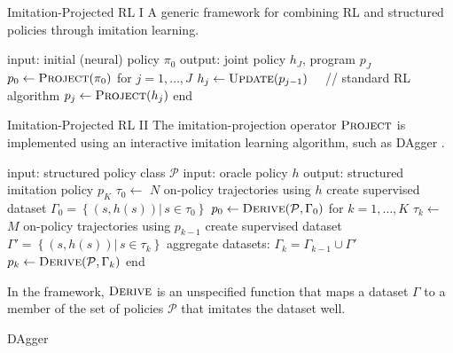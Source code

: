 \begin{frame}[fragile]{Imitation-Projected RL I}
A generic framework for combining RL and structured policies through imitation learning.


\begin{algorithm}[caption={Imitation-Projected Programmatic Reinforcement Learning}]
 input: initial (neural) policy $\pi_0$
 output: joint policy $h_J$, program $p_J$
 $p_0 \leftarrow \textsc{Project}(\pi_0)$
 for $j = 1, \dots, J$
   $h_j \leftarrow \textsc{Update}(p_{j-1}) \quad$ // standard RL algorithm
   $p_j \leftarrow \textsc{Project}(h_j)$
 end
\end{algorithm}

\end{frame}

\begin{frame}[fragile]{Imitation-Projected RL II}
The imitation-projection operator $\textsc{Project}$ is implemented using an interactive imitation learning algorithm, such as DAgger \citep{ross2011reduction}.

\begin{algorithm}[caption={$\textsc{Project}$: imitation learning}]
 input: structured policy class $\mathcal{P}$
 input: oracle policy $h$
 output: structured imitation policy $p_K$
 $\tau_0 \leftarrow $ $N$ on-policy trajectories using $h$
 create supervised dataset $\Gamma_0 = \left\{\left(s, h(s)\right) |\, s \in \tau_0 \right\}$
 $p_0 \leftarrow \textsc{Derive}(\mathcal{P}, \Gamma_0)$
 for $k = 1, \dots, K$
   $\tau_k \leftarrow $ $M$ on-policy trajectories using $p_{k-1}$
   create supervised dataset $\Gamma' = \left\{\left(s, h(s)\right) |\, s \in \tau_k \right\}$
   aggregate datasets: $\Gamma_k = \Gamma_{k-1} \cup \Gamma' \quad$
   $p_k \leftarrow \textsc{Derive}(\mathcal{P}, \Gamma_k)$
 end
\end{algorithm}

In the framework, $\textsc{Derive}$ is an unspecified function that maps a dataset $\Gamma$ to a member of the set of policies $\mathcal{P}$ that imitates the dataset well.


\end{frame}

\begin{frame}{DAgger}
    
\end{frame}


